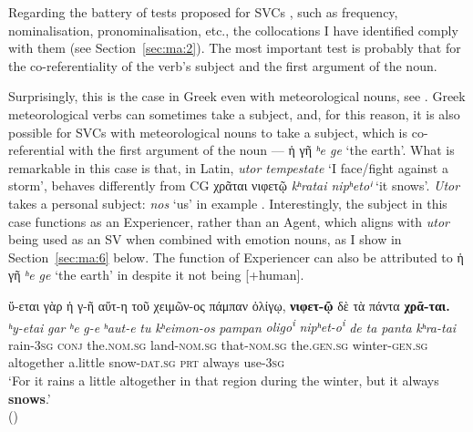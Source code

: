 \documentclass[output=paper,colorlinks,citecolor=brown]{langscibook}
\begin{document}
Regarding the battery of tests proposed for SVCs
\parencites{langer_linguistic_2004,jimenez_lopez_support_2016}, such as frequency,
nominalisation, pronominalisation, etc., the collocations I have identified comply with
them (see Section~\ref{sec:ma:2}). The most important test is probably that for the
co-referentiality of the verb's subject and the first argument of the noun.

Surprisingly, this is the case in Greek even with meteorological nouns, see .
Greek meteorological verbs can sometimes take a subject, and, for this reason, it is also
possible for SVCs with meteorological nouns to take a subject, which is co-referential
with the first argument of the noun --- ἡ γῆ \emph{ʰe ge} `the earth'. What is remarkable in this case is that, in Latin, \emph{utor tempestate} `I
face/fight against a storm', behaves differently from CG χρᾶται νιφετῷ
\emph{kʰratai nipʰetoⁱ} `it snows'. \emph{Utor} takes
a personal subject: \emph{nos} `us' in example . Interestingly, the subject
in this case functions as an Experiencer, rather than an Agent, which aligns with
\emph{utor} being used as an SV when combined with emotion nouns, as I show in
Section~\ref{sec:ma:6} below. The function of Experiencer can also be attributed to ἡ γῆ
\emph{ʰe ge} `the earth' in  despite it not being
{[}+human{]}.


\ea\label{ex:ma:3}

\ea\label{ex:ma:3a}

\glll ὕ-εται γὰρ ἡ γ-ῆ αὕτ-η τοῦ χειμῶν-ος πάμπαν ὀλίγῳ, \textbf{νιφετ-ῷ} δὲ {τὰ πάντα} \textbf{χρᾶ-ται.}\\
 \textit{ʰy-etai} \textit{gar} \textit{ʰe} \textit{g-e} \textit{ʰaut-e} \textit{tu} \textit{kʰeimon-os} \textit{pampan} \textit{oligo\textsuperscript{i}}
\textit{nipʰet-o\textsuperscript{i}} \textit{de} \textit{{ta} \textit{panta}} \textit{kʰra-tai}\\
rain-\textsc{3sg} \textsc{conj} the.\textsc{nom.sg} land-\textsc{nom.sg} that-\textsc{nom.sg} the.\textsc{gen.sg} winter-\textsc{gen.sg} altogether a.little snow-\textsc{dat.sg}
\textsc{prt} always use-3\textsc{sg}\\
\glt `For it rains a little altogether in that region during the winter, but it always \textbf{snows}.' \\
\hspace*{\fill}()
\end{document}
